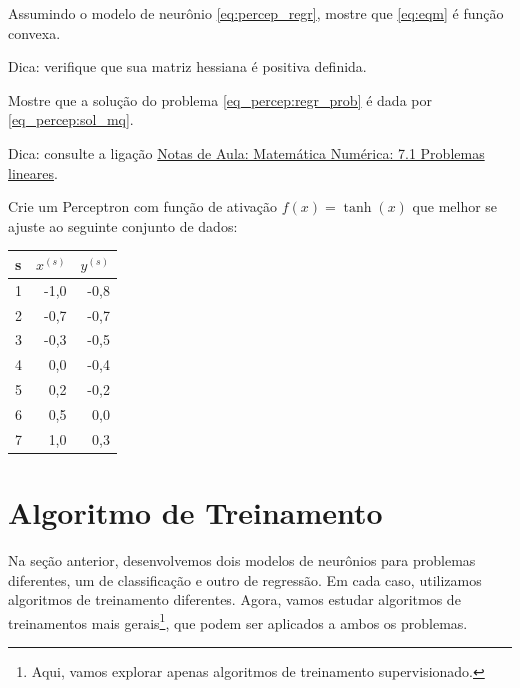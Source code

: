 \begin{exer}\label{exer:eqm_convexa}
  Assumindo o modelo de neurônio \eqref{eq:percep_regr}, mostre que \eqref{eq:eqm} é função convexa.
\end{exer}
\begin{resp}
  Dica: verifique que sua matriz hessiana é positiva definida.
\end{resp}

\begin{exer}\label{exer_percep:sol_mq}
  Mostre que a solução do problema \eqref{eq_percep:regr_prob} é dada por \eqref{eq_percep:sol_mq}.
\end{exer}
\begin{resp}
  Dica: consulte a ligação \href{https://notaspedrok.com.br/notas/MatematicaNumerica/cap_ajuste_sec_prob_lin.html}{Notas de Aula: Matemática Numérica: 7.1 Problemas lineares}.
\end{resp}

\begin{exer}
  Crie um Perceptron com função de ativação $f(x)=\tanh(x)$ que melhor se ajuste ao seguinte conjunto de dados:
  \begin{center}
  \begin{tabular}{l|rr}
    s & $x^{(s)}$ & $y^{(s)}$\\\hline
    1 & -1,0 & -0,8 \\
    2 & -0,7 & -0,7 \\
    3 & -0,3 & -0,5 \\
    4 &  0,0 & -0,4 \\
    5 &  0,2 & -0,2 \\
    6 &  0,5 &  0,0 \\
    7 &  1,0 &  0,3 \\\hline
  \end{tabular}
\end{center}
\end{exer}

\section{Algoritmo de Treinamento}\label{cap_percepton_sec_train}

Na seção anterior, desenvolvemos dois modelos de neurônios para problemas diferentes, um de classificação e outro de regressão. Em cada caso, utilizamos algoritmos de treinamento diferentes. Agora, vamos estudar algoritmos de treinamentos mais gerais\footnote{Aqui, vamos explorar apenas algoritmos de treinamento supervisionado.}, que podem ser aplicados a ambos os problemas.

